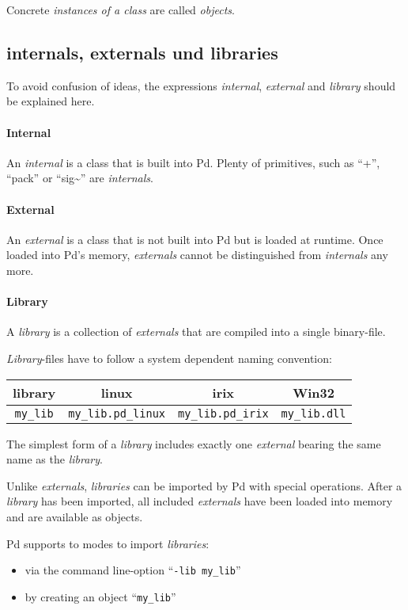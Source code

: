 \documentclass[12pt, a4paper,english,titlepage]{article}
\begin{document}
Concrete {\em instances of a class} are called {\em objects}.

\subsection{internals, externals und libraries}

To avoid confusion of ideas, the expressions {\em internal}, {\em external} and
{\em library} should be explained here.

\paragraph{Internal}
An {\em internal} is a class that is built into Pd.
Plenty of primitives, such as ``+'', ``pack'' or ``sig\~\/'' are {\em internals}.

\paragraph{External}
An {\em external} is a class that is not built into Pd but is loaded at runtime.
Once loaded into Pd's memory, {\em externals} cannot be distinguished from
{\em internals} any more.

\paragraph{Library}
A {\em library} is a collection of {\em externals} that are compiled into a 
single binary-file.

{\em Library}-files have to follow a system dependent naming convention:

\begin{tabular}{c||c|c|c}
library & linux&irix&Win32 \\
\hline
{\tt my\_lib}&{\tt  my\_lib.pd\_linux}&{\tt  my\_lib.pd\_irix}&
{\tt  my\_lib.dll}\\
\end{tabular}

The simplest form of a {\em library} includes exactly one {\em external}
bearing the same name as the {\em library}.

Unlike {\em externals}, {\em libraries} can be imported by Pd with special operations.
After a {\em library} has been imported,
all included {\em externals} have been loaded into memory and are available as objects.

Pd supports to modes to import {\em libraries}:

\begin{itemize}
\item via the command line-option ``{\tt -lib my\_lib}''
\item by creating an object ``{\tt my\_lib}''
\end{itemize}
\end{document}
